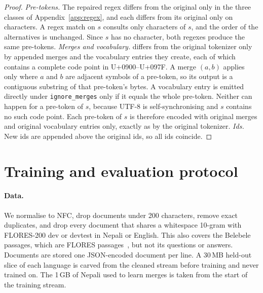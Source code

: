 \begin{proof}
\emph{Pre-tokens.} The repaired regex differs from the original only in the three classes of Appendix~\ref{app:regex}, and each differs from its original only on \pM{} characters. A regex match on $s$ consults only characters of $s$, and the order of the alternatives is unchanged. Since $s$ has no \pM{} character, both regexes produce the same pre-tokens.
\emph{Merges and vocabulary.} \RII{} differs from the original tokenizer only by appended merges and the vocabulary entries they create, each of which contains a complete code point in U+0900--U+097F. A merge $(a,b)$ applies only where $a$ and $b$ are adjacent symbols of a pre-token, so its output is a contiguous substring of that pre-token's bytes. A vocabulary entry is emitted directly under \texttt{ignore\_merges} only if it equals the whole pre-token. Neither can happen for a pre-token of $s$, because UTF-8 is self-synchronising and $s$ contains no such code point. Each pre-token of $s$ is therefore encoded with original merges and original vocabulary entries only, exactly as by the original tokenizer.
\emph{Ids.} New ids are appended above the original ids, so all ids coincide.
\end{proof}

\section{Training and evaluation protocol}
\label{app:protocol}

\paragraph{Data.} We normalise to NFC, drop documents under 200 characters, remove exact duplicates, and drop every document that shares a whitespace 10-gram with FLORES-200 dev or devtest in Nepali or English. This also covers the Belebele passages, which are FLORES passages~\citep{bandarkar-etal-2024-belebele}, but not its questions or answers. Documents are stored one JSON-encoded document per line. A 30\,MB held-out slice of each language is carved from the cleaned stream before training and never trained on. The 1\,GB of Nepali used to learn merges is taken from the start of the training stream.

